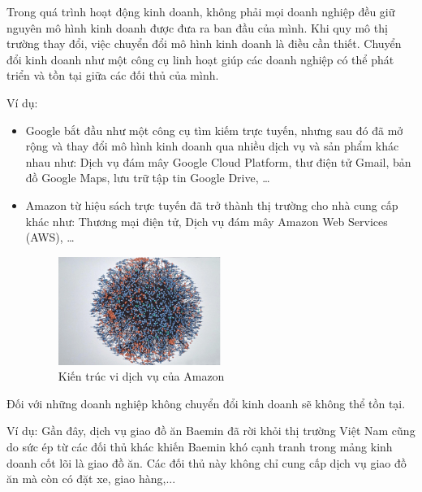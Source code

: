 Trong quá trình hoạt động kinh doanh, không phải mọi doanh nghiệp đều giữ nguyên mô hình kinh doanh được đưa ra ban đầu của mình. Khi quy mô thị trường thay đổi, việc chuyển đổi mô hình kinh doanh là điều cần thiết. Chuyển đổi kinh doanh như một công cụ linh hoạt giúp các doanh nghiệp có thể phát triển và tồn tại giữa các đối thủ của mình.

Ví dụ:

\begin{itemize}

\item Google bắt đầu như một công cụ tìm kiếm trực tuyến, nhưng sau đó đã mở rộng và thay đổi mô hình kinh doanh qua nhiều dịch vụ và sản phẩm khác nhau như: Dịch vụ đám mây Google Cloud Platform, thư điện tử Gmail, bản đồ Google Maps, lưu trữ tập tin Google Drive, \dots

\item Amazon từ hiệu sách trực tuyến đã trở thành thị trường cho nhà cung cấp khác như: Thương mại điện tử, Dịch vụ đám mây Amazon Web Services (AWS), \dots

\begin{figure}[h]

\centering

\includegraphics[width = 0.5\textwidth]{pictures/KienTrucViDichVuAmazon/main.png}

\caption{Kiến trúc vi dịch vụ của Amazon}

\end{figure}

\end{itemize}

Đối với những doanh nghiệp không chuyển đổi kinh doanh sẽ không thể tồn tại.

Ví dụ: Gần đây, dịch vụ giao đồ ăn Baemin đã rời khỏi thị trường Việt Nam cũng do sức ép từ các đối thủ khác khiến Baemin khó cạnh tranh trong mảng kinh doanh cốt lõi là giao đồ ăn. Các đối thủ này không chỉ cung cấp dịch vụ giao đồ ăn mà còn có đặt xe, giao hàng,...

